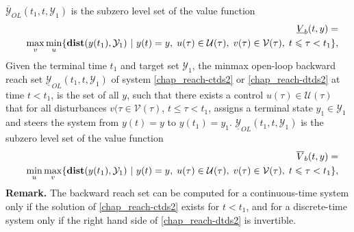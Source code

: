 \documentclass[letterpaper,10pt,english]{sphinxmanual}
\begin{document}
$\overline{{\mathcal Y}}_{OL}(t_1, t, {\mathcal Y}_1)$ is the
subzero level set of the value function
\label{chap_reach:equation-maxminvfb}\begin{gather}
\begin{split}\begin{aligned}
&&\underline{V}_b(t, y) = \nonumber \\
&&\max_v\min_u\{{\bf dist}(y(t_1), {\mathcal Y}_1) ~|~ y(t)=y, \; u(\tau)\in{\mathcal U}(\tau), \;
v(\tau)\in{\mathcal V}(\tau), \; t\leqslant\tau<t_1\},
\end{aligned}\end{split}\label{chap_reach-maxminvfb}
\end{gather}
Given the terminal time $t_1$ and target set
${\mathcal Y}_1$, the minmax open-loop backward reach set
$\underline{{\mathcal Y}}_{OL}(t_1, t, {\mathcal Y}_1)$ of system
\eqref{chap_reach-ctds2} or \eqref{chap_reach-dtds2} at time $t<t_1$, is the set of all $y$,
such that there exists a control $u(\tau)\in{\mathcal U}(\tau)$
that for all disturbances $v(\tau\in{\mathcal V}(\tau)$,
$t\leqslant\tau<t_1$, assigns a terminal state
$y_1\in{\mathcal Y}_1$ and steers the system from $y(t)=y$
to $y(t_1)=y_1$.
$\underline{{\mathcal Y}}_{OL}(t_1, t, {\mathcal Y}_1)$ is the
subzero level set of the value function
\label{chap_reach:equation-minmaxvfb}\begin{gather}
\begin{split}\begin{aligned}
&&\overline{V}_b(t, y) = \nonumber \\
&&\min_u\max_v\{{\bf dist}(y(t_1), {\mathcal Y}_1) ~|~ y(t)=y, \; u(\tau)\in{\mathcal U}(\tau), \;
v(\tau)\in{\mathcal V}(\tau), \; t\leqslant\tau<t_1\},
\end{aligned}\end{split}\label{chap_reach-minmaxvfb}
\end{gather}
\textbf{Remark.} The backward reach set can be computed for a continuous-time
system only if the solution of \eqref{chap_reach-ctds2} exists for $t<t_1$, and
for a discrete-time system only if the right hand side of \eqref{chap_reach-dtds2} is
invertible.
\end{document}
